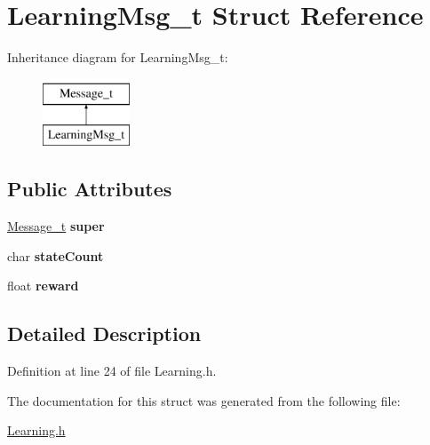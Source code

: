 \hypertarget{structLearningMsg__t}{
\section{LearningMsg\_\-t Struct Reference}
\label{structLearningMsg__t}
}
Inheritance diagram for LearningMsg\_\-t:\begin{figure}[H]
\begin{center}
\leavevmode
\includegraphics[height=2.000000cm]{structLearningMsg__t}
\end{center}
\end{figure}
\subsection*{Public Attributes}
\begin{DoxyCompactItemize}
\item 
\hypertarget{structLearningMsg__t_a78c17600483af8976973352965e78344}{
\hyperlink{structMessage__t}{Message\_\-t} {\bfseries super}}
\label{structLearningMsg__t_a78c17600483af8976973352965e78344}

\item 
\hypertarget{structLearningMsg__t_abfc2af7d9f2e42f0553a17d90842b7cd}{
char {\bfseries stateCount}}
\label{structLearningMsg__t_abfc2af7d9f2e42f0553a17d90842b7cd}

\item 
\hypertarget{structLearningMsg__t_adcdd80f5f5895397a8d452b9aa875aa0}{
float {\bfseries reward}}
\label{structLearningMsg__t_adcdd80f5f5895397a8d452b9aa875aa0}

\end{DoxyCompactItemize}


\subsection{Detailed Description}


Definition at line 24 of file Learning.h.



The documentation for this struct was generated from the following file:\begin{DoxyCompactItemize}
\item 
\hyperlink{Learning_8h}{Learning.h}\end{DoxyCompactItemize}
